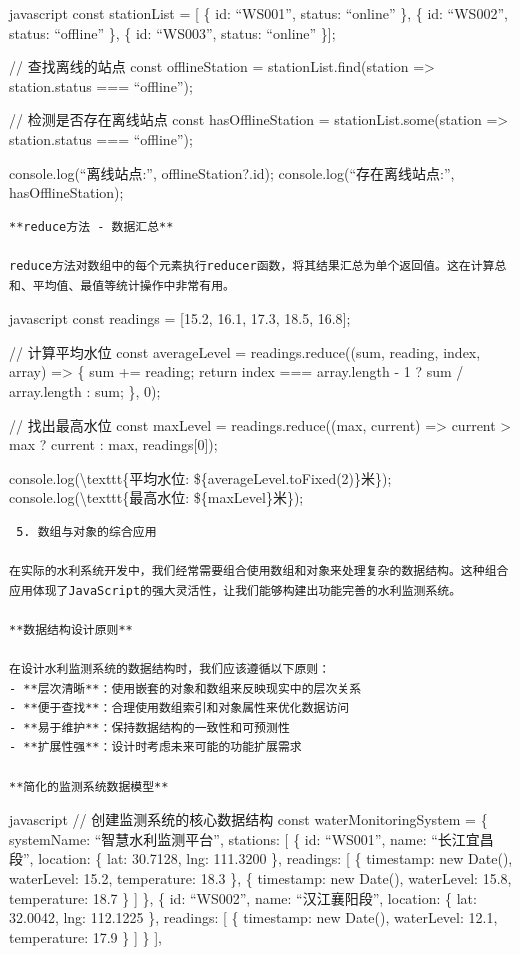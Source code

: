 {javascript const stationList = {[} \{ id: ``WS001'', status: ``online'' \}, \{ id: ``WS002'', status: ``offline'' \}, \{ id: ``WS003'', status: ``online'' \}{]};

// 查找离线的站点 const offlineStation = stationList.find(station =\textgreater{} station.status === ``offline'');

// 检测是否存在离线站点 const hasOfflineStation = stationList.some(station =\textgreater{} station.status === ``offline'');

console.log(``离线站点:'', offlineStation?.id); console.log(``存在离线站点:'', hasOfflineStation);

\begin{lstlisting}
**reduce方法 - 数据汇总**

reduce方法对数组中的每个元素执行reducer函数，将其结果汇总为单个返回值。这在计算总和、平均值、最值等统计操作中非常有用。
\end{lstlisting}

javascript const readings = {[}15.2, 16.1, 17.3, 18.5, 16.8{]};

// 计算平均水位 const averageLevel = readings.reduce((sum, reading, index, array) =\textgreater{} \{ sum += reading; return index === array.length - 1 ? sum / array.length : sum; \}, 0);

// 找出最高水位 const maxLevel = readings.reduce((max, current) =\textgreater{} current \textgreater{} max ? current : max, readings{[}0{]});

console.log(\textbackslash texttt\{平均水位: \$\{averageLevel.toFixed(2)\}米\}); console.log(\textbackslash texttt\{最高水位: \$\{maxLevel\}米\});

\begin{lstlisting}
 5. 数组与对象的综合应用

在实际的水利系统开发中，我们经常需要组合使用数组和对象来处理复杂的数据结构。这种组合应用体现了JavaScript的强大灵活性，让我们能够构建出功能完善的水利监测系统。

**数据结构设计原则**

在设计水利监测系统的数据结构时，我们应该遵循以下原则：
- **层次清晰**：使用嵌套的对象和数组来反映现实中的层次关系
- **便于查找**：合理使用数组索引和对象属性来优化数据访问
- **易于维护**：保持数据结构的一致性和可预测性
- **扩展性强**：设计时考虑未来可能的功能扩展需求

**简化的监测系统数据模型**
\end{lstlisting}

javascript // 创建监测系统的核心数据结构 const waterMonitoringSystem = \{ systemName: ``智慧水利监测平台'', stations: {[} \{ id: ``WS001'', name: ``长江宜昌段'', location: \{ lat: 30.7128, lng: 111.3200 \}, readings: {[} \{ timestamp: new Date(), waterLevel: 15.2, temperature: 18.3 \}, \{ timestamp: new Date(), waterLevel: 15.8, temperature: 18.7 \} {]} \}, \{ id: ``WS002'', name: ``汉江襄阳段'', location: \{ lat: 32.0042, lng: 112.1225 \}, readings: {[} \{ timestamp: new Date(), waterLevel: 12.1, temperature: 17.9 \} {]} \} {]},

}
